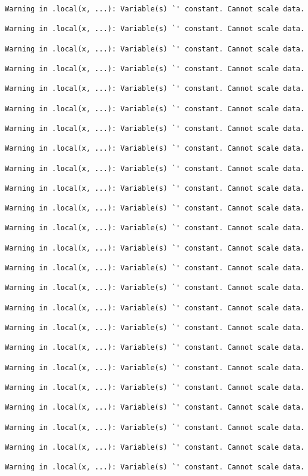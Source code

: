 \documentclass[
  letterpaper,
  DIV=11,
  numbers=noendperiod]{scrartcl}
\begin{document}
\begin{verbatim}
Warning in .local(x, ...): Variable(s) `' constant. Cannot scale data.

Warning in .local(x, ...): Variable(s) `' constant. Cannot scale data.

Warning in .local(x, ...): Variable(s) `' constant. Cannot scale data.

Warning in .local(x, ...): Variable(s) `' constant. Cannot scale data.

Warning in .local(x, ...): Variable(s) `' constant. Cannot scale data.

Warning in .local(x, ...): Variable(s) `' constant. Cannot scale data.

Warning in .local(x, ...): Variable(s) `' constant. Cannot scale data.

Warning in .local(x, ...): Variable(s) `' constant. Cannot scale data.

Warning in .local(x, ...): Variable(s) `' constant. Cannot scale data.

Warning in .local(x, ...): Variable(s) `' constant. Cannot scale data.

Warning in .local(x, ...): Variable(s) `' constant. Cannot scale data.

Warning in .local(x, ...): Variable(s) `' constant. Cannot scale data.

Warning in .local(x, ...): Variable(s) `' constant. Cannot scale data.

Warning in .local(x, ...): Variable(s) `' constant. Cannot scale data.

Warning in .local(x, ...): Variable(s) `' constant. Cannot scale data.

Warning in .local(x, ...): Variable(s) `' constant. Cannot scale data.

Warning in .local(x, ...): Variable(s) `' constant. Cannot scale data.

Warning in .local(x, ...): Variable(s) `' constant. Cannot scale data.

Warning in .local(x, ...): Variable(s) `' constant. Cannot scale data.

Warning in .local(x, ...): Variable(s) `' constant. Cannot scale data.

Warning in .local(x, ...): Variable(s) `' constant. Cannot scale data.

Warning in .local(x, ...): Variable(s) `' constant. Cannot scale data.

Warning in .local(x, ...): Variable(s) `' constant. Cannot scale data.

Warning in .local(x, ...): Variable(s) `' constant. Cannot scale data.


\end{verbatim}
\end{document}

